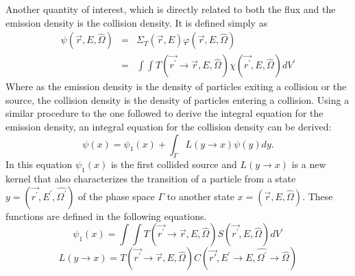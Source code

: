 Another quantity of interest, which is directly related to both the flux and 
the emission density is the collision density. It is defined simply as
\begin{eqnarray}
  \psi(\vec{r},E,\hat{\Omega}) & = & \Sigma_T(\vec{r},E)
  \varphi(\vec{r},E,\hat{\Omega}) \\
  & = & \int\int T(\vec{r^{'}} \to \vec{r},E,\hat{\Omega})
  \chi(\vec{r^{'}},E,\hat{\Omega})dV^{'}
\end{eqnarray}
Where as the emission density is the density of particles exiting a collision
or the source, the collision density is the density of particles entering a 
collision. Using a similar procedure to the one followed to derive the 
integral equation for the emission density, an integral equation for the 
collision density can be derived:
\begin{equation*}
  \psi(x) = \psi_1(x) + \int_{\Gamma} L(y \to x)\psi(y)dy.
\end{equation*}
In this equation $\psi_1(x)$ is the first collided source and $L(y \to x)$ is
a new kernel that also characterizes the transition of a particle from a state 
$y = (\vec{r^{'}},E^{'},\hat{\Omega^{'}})$ of the phase space $\Gamma$ to another 
state $x = (\vec{r},E,\hat{\Omega})$. These functions are defined in the 
following equations.
\begin{equation}
  \psi_1(x) = \int\int T(\vec{r^{'}} \to \vec{r},E,\hat{\Omega})
  S(\vec{r^{'}},E,\hat{\Omega})dV^{'}
\end{equation}
\begin{equation}
  L(y \to x) =
  T(\vec{r^{'}} \to \vec{r},E,\hat{\Omega})
  C(\vec{r'},E^{'} \to E,\hat{\Omega^{'}} \to \hat{\Omega})
\end{equation}

